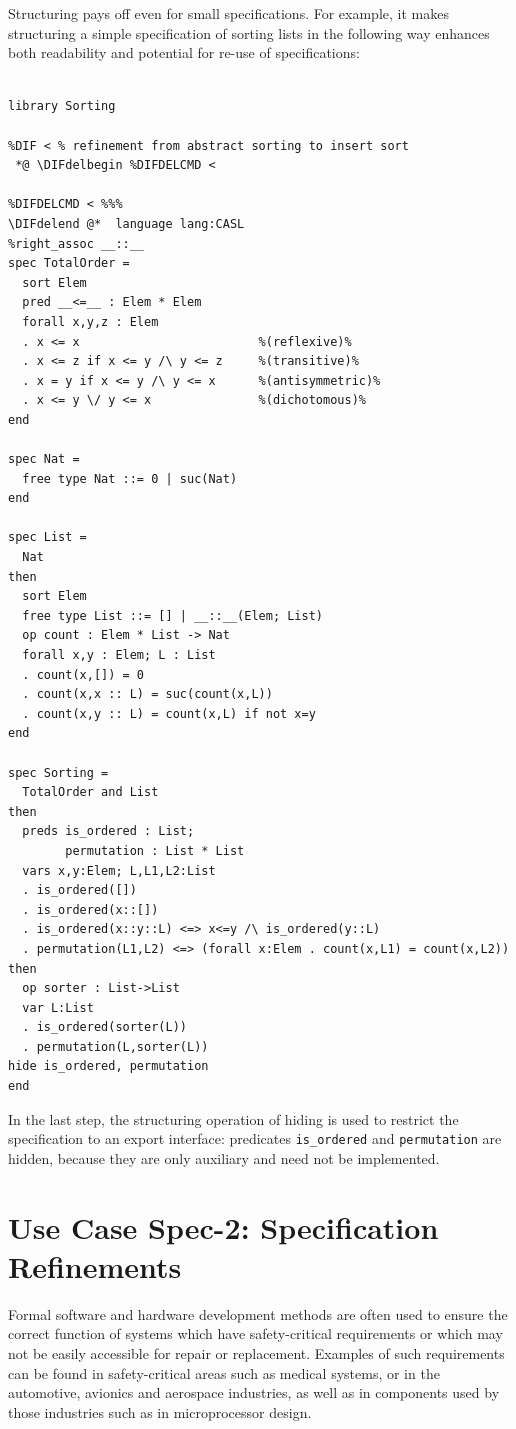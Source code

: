 \documentclass[10pt,fleqn,final]{scrreprt}
\newenvironment{definitions}[0]{\medskip }{}
\providecommand{\DIFdelbegin}{} %
\providecommand{\DIFdelend}{} %
\begin{document}
\begin{definitions}
Structuring pays off even for small specifications. For example, it makes
structuring a simple specification of sorting lists in the 
following way enhances both readability and potential for re-use
of specifications:

\begin{lstlisting}[basicstyle=\ttfamily\footnotesize,language=dolText,alsolanguage=CASL,escapechar=@,mathescape]	
%prefix( lang:  <http://purl.net/DOL/languages/> )%

library Sorting

%DIF < % refinement from abstract sorting to insert sort
 *@ \DIFdelbegin %DIFDELCMD < 

%DIFDELCMD < %%%
\DIFdelend @*  language lang:CASL
%right_assoc __::__
spec TotalOrder =
  sort Elem
  pred __<=__ : Elem * Elem
  forall x,y,z : Elem
  . x <= x                         %(reflexive)%
  . x <= z if x <= y /\ y <= z     %(transitive)%
  . x = y if x <= y /\ y <= x      %(antisymmetric)%
  . x <= y \/ y <= x               %(dichotomous)%
end

spec Nat =
  free type Nat ::= 0 | suc(Nat)
end

spec List =
  Nat
then
  sort Elem
  free type List ::= [] | __::__(Elem; List)
  op count : Elem * List -> Nat
  forall x,y : Elem; L : List
  . count(x,[]) = 0
  . count(x,x :: L) = suc(count(x,L))
  . count(x,y :: L) = count(x,L) if not x=y
end

spec Sorting =
  TotalOrder and List
then
  preds is_ordered : List;
        permutation : List * List
  vars x,y:Elem; L,L1,L2:List
  . is_ordered([])
  . is_ordered(x::[])
  . is_ordered(x::y::L) <=> x<=y /\ is_ordered(y::L)
  . permutation(L1,L2) <=> (forall x:Elem . count(x,L1) = count(x,L2))
then
  op sorter : List->List
  var L:List
  . is_ordered(sorter(L))
  . permutation(L,sorter(L))
hide is_ordered, permutation
end
\end{lstlisting}

In the last step, the structuring operation of hiding is used to
restrict the specification to an export interface: 
 predicates \texttt{is\_ordered} and \texttt{permutation} are hidden, because they
are only auxiliary and need not be implemented.


\section{Use Case Spec-2: Specification Refinements}\label{spec-2}
Formal software and hardware development methods are often used to
ensure the correct function of systems which have safety-critical
requirements or which may not be easily accessible for repair or
replacement.  Examples of such requirements can be found in
safety-critical areas such as medical systems, or in the automotive,
avionics and aerospace industries, as well as in components used by
those industries such as in microprocessor design.


\end{definitions}
\end{document}
